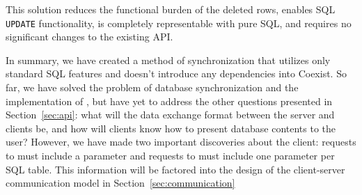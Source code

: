 This solution reduces the functional burden of the deleted rows, enables SQL
\texttt{UPDATE} functionality, is completely representable with pure SQL, and
requires no significant changes to the existing API. 



In summary, we have created a method of synchronization that utilizes
only standard SQL features and doesn't introduce any dependencies into Coexist. So far,
we have solved the problem of database synchronization and the implementation of
\sync, but have yet to address
the other questions presented in Section~\ref{sec:api}: what will the data
exchange format between the server and clients be, and how will clients know how
to present database contents to the user? However, we have made two important
discoveries about the client: requests to \create must include a
 parameter and requests to \sync must include one 
parameter per SQL table. This information will be factored into the design of
the client-server communication model in Section~\ref{sec:communication}

